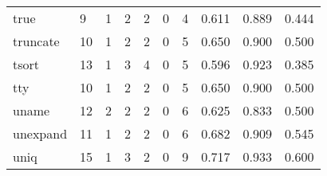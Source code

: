 \begin{longtable}{lp{2.0cm}p{2.0cm}p{2.0cm}p{2.0cm}p{2.0cm}p{2.0cm}p{2.0cm}p{2.0cm}p{2.0cm}}
true      &                      9 &                                             1 &                                            2 &                                           2 &                                            0 &                                          4 &                                0.611 &                                  0.889 &                                0.444 \\
truncate  &                     10 &                                             1 &                                            2 &                                           2 &                                            0 &                                          5 &                                0.650 &                                  0.900 &                                0.500 \\
tsort     &                     13 &                                             1 &                                            3 &                                           4 &                                            0 &                                          5 &                                0.596 &                                  0.923 &                                0.385 \\
tty       &                     10 &                                             1 &                                            2 &                                           2 &                                            0 &                                          5 &                                0.650 &                                  0.900 &                                0.500 \\
uname     &                     12 &                                             2 &                                            2 &                                           2 &                                            0 &                                          6 &                                0.625 &                                  0.833 &                                0.500 \\
unexpand  &                     11 &                                             1 &                                            2 &                                           2 &                                            0 &                                          6 &                                0.682 &                                  0.909 &                                0.545 \\
uniq      &                     15 &                                             1 &                                            3 &                                           2 &                                            0 &                                          9 &                                0.717 &                                  0.933 &                                0.600 \\

\end{longtable}
